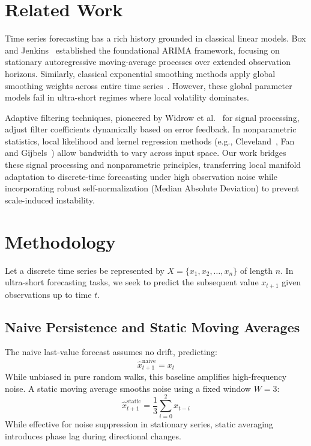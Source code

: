 \documentclass[10type,twocolumn,letterpaper]{article}
\begin{document}
\section{Related Work}

Time series forecasting has a rich history grounded in classical linear models. Box and Jenkins~\cite{box1970time} established the foundational ARIMA framework, focusing on stationary autoregressive moving-average processes over extended observation horizons. Similarly, classical exponential smoothing methods apply global smoothing weights across entire time series~\cite{holts1957forecasting}. However, these global parameter models fail in ultra-short regimes where local volatility dominates.

Adaptive filtering techniques, pioneered by Widrow et al.~\cite{widrow1975adaptive} for signal processing, adjust filter coefficients dynamically based on error feedback. In nonparametric statistics, local likelihood and kernel regression methods (e.g., Cleveland~\cite{cleveland1979robust}, Fan and Gijbels~\cite{fan1996local}) allow bandwidth to vary across input space. Our work bridges these signal processing and nonparametric principles, transferring local manifold adaptation to discrete-time forecasting under high observation noise while incorporating robust self-normalization (Median Absolute Deviation) to prevent scale-induced instability.

\section{Methodology}

Let a discrete time series be represented by $X = \{x_1, x_2, \dots, x_n\}$ of length $n$. In ultra-short forecasting tasks, we seek to predict the subsequent value $x_{t+1}$ given observations up to time $t$.

\subsection{Naive Persistence and Static Moving Averages}

The naive last-value forecast assumes no drift, predicting:
$$\hat{x}_{t+1}^{\text{naive}} = x_t$$
While unbiased in pure random walks, this baseline amplifies high-frequency noise. A static moving average smooths noise using a fixed window $W=3$:
$$\hat{x}_{t+1}^{\text{static}} = \frac{1}{3} \sum_{i=0}^{2} x_{t-i}$$
While effective for noise suppression in stationary series, static averaging introduces phase lag during directional changes.
\end{document}
